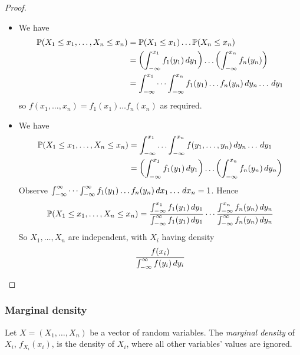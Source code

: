 \documentclass{../../template/note}
\begin{document}
    \begin{proof}
        \begin{itemize}
            \item We have
            \begin{align*}
                \mathbb P(X_1 \leq x_1, \dots, X_n \leq x_n) &= \mathbb P(X_1 \leq x_1) \dots \mathbb P(X_n \leq x_n) \\
                &= \left(\int_{-\infty}^{x_1} f_1(y_1) \,d{y}_1\right) \dots \left(\int_{-\infty}^{x_n}f_n(y_n)\right) \\
                &= \int_{-\infty}^{x_1} \cdots \int_{-\infty}^{x_n} f_1(y_1) \dots f_n(y_n) \,d{y}_n \dots \,d{y}_1
            \end{align*}
            so \(f(x_1, \dots, x_n) = f_1(x_1) \dots f_n(x_n)\) as required.         
            
            \item We have
            \begin{align*}
                \mathbb P(X_1 \leq x_1, \dots, X_n \leq x_n) &= \int_{-\infty}^{x_1} \dots \int_{-\infty}^{x_n} f(y_1, \dots, y_n) \,d{y}_n \dots \,d{y}_1 \\
                &= \left(\int_{-\infty}^{x_1} f_1(y_1) \,d{y}_1\right) \dots \left(\int_{-\infty}^{x_n} f_n(y_n) \,d{y}_n\right)
            \end{align*}
            Observe \(\int_{-\infty}^\infty \cdots \int_{-\infty}^\infty f_1(y_1) \dots f_n(y_n) \,d{x}_1 \dots \,d{x}_n = 1\). Hence
            \begin{align*}
                \mathbb P(X_1 \leq x_1, \dots, X_n \leq x_n) = \frac{\int_{-\infty}^{x_1} f_1(y_1) \,d{y}_1}{\int_{-\infty}^\infty f_1(y_1) \,d{y}_1} \cdots \frac{\int_{-\infty}^{x_n} f_n(y_n) \,d{y}_n}{\int_{-\infty}^\infty f_n(y_n) \,d{y}_n}
            \end{align*}
            So \(X_1, \dots, X_n\) are independent, with \(X_i\) having density
            \begin{align*}
                \frac{f(x_i)}{\int_{-\infty}^\infty f(y_i) \,d{y}_i}
            \end{align*}
        \end{itemize}
    \end{proof}
    
    \subsubsection{Marginal density}

    \begin{definition}
        Let \(X = (X_1, \dots, X_n)\) be a vector of random variables. The \emph{marginal density} of \(X_i\), \(f_{X_i}(x_i)\), is the density of \(X_i\), where all other variables' values are ignored.
    \end{definition}
    
\end{document}
